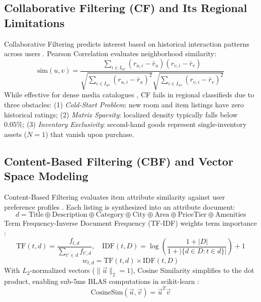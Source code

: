 \subsection{Collaborative Filtering (CF) and Its Regional Limitations}
Collaborative Filtering predicts interest based on historical interaction patterns across users \cite{sarwar2001item}. Pearson Correlation evaluates neighborhood similarity:
\begin{equation}
\text{sim}(u, v) = \frac{\sum_{i \in I_{uv}} (r_{u, i} - \bar{r}_u)(r_{v, i} - \bar{r}_v)}{\sqrt{\sum_{i \in I_{uv}} (r_{u, i} - \bar{r}_u)^2} \sqrt{\sum_{i \in I_{uv}} (r_{v, i} - \bar{r}_v)^2}}
\end{equation}
While effective for dense media catalogues \cite{koren2009matrix}, CF fails in regional classifieds due to three obstacles: (1) \textit{Cold-Start Problem}: new room and item listings have zero historical ratings; (2) \textit{Matrix Sparsity}: localized density typically falls below $0.05\%$; (3) \textit{Inventory Exclusivity}: second-hand goods represent single-inventory assets ($N=1$) that vanish upon purchase.

\subsection{Content-Based Filtering (CBF) and Vector Space Modeling}
Content-Based Filtering evaluates item attribute similarity against user preference profiles \cite{lops2011content}. Each listing is synthesized into an attribute document:
\begin{equation}
d = \text{Title} \oplus \text{Description} \oplus \text{Category} \oplus \text{City} \oplus \text{Area} \oplus \text{PriceTier} \oplus \text{Amenities}
\end{equation}
Term Frequency-Inverse Document Frequency (TF-IDF) weights term importance \cite{salton1988term}:
\begin{equation}
\text{TF}(t, d) = \frac{f_{t, d}}{\sum_{t' \in d} f_{t', d}}, \quad \text{IDF}(t, D) = \log\left(\frac{1 + |D|}{1 + |\{d \in D : t \in d\}|}\right) + 1
\end{equation}
\begin{equation}
w_{t, d} = \text{TF}(t, d) \times \text{IDF}(t, D)
\end{equation}
With $L_2$-normalized vectors ($\|\vec{u}\|_2 = 1$), Cosine Similarity simplifies to the dot product, enabling sub-5ms BLAS computations in scikit-learn \cite{pedregosa2011scikit}:
\begin{equation}
\text{CosineSim}(\vec{u}, \vec{v}) = \vec{u}^T \vec{v}
\end{equation}

